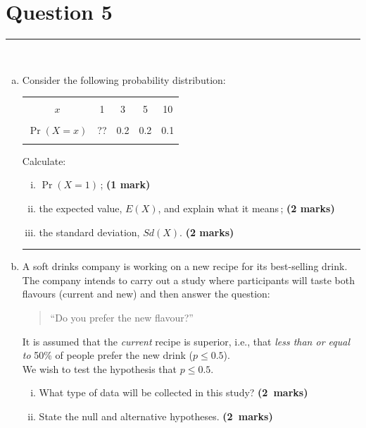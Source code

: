\documentclass[12pt]{article}
\begin{document}
\section*{Question 5 }
\noindent\rule{\linewidth}{1pt}
\quad\\[-0.5cm]
\begin{enumerate}[a)]
\item Consider the following probability distribution:
\begin{center}
\begin{tabular}{|c|cccc|}
\hline
&&&&\\[-0.4cm]
$x$        & 1 & 3 & 5 & 10 \\
\hline
&&&&\\[-0.4cm]
$\Pr(X=x)$ & ?? & 0.2 & 0.2 & 0.1 \\
\hline
\multicolumn{5}{c}{}
\end{tabular}
\end{center}
Calculate:
    \begin{enumerate}[i)]\itemsep0.2cm
    \item $\Pr(X=1)$\,; \hfill{\scriptsize \bf (1 mark)}
    \item the expected value, $E(X)$, and explain what it means\,; \hfill{\scriptsize \bf (2 marks)}
    \item the standard deviation, $Sd(X)$. \hfill{\scriptsize \bf (2 marks)}
    \end{enumerate}
\begin{center}\noindent\rule{0.4\linewidth}{0.5pt}\end{center}
\item A soft drinks company is working on a new recipe for its best-selling drink. The company intends to carry out a study where participants will taste both flavours (current and new) and then answer the question:
    \begin{quotation}
    ``Do you prefer the new flavour?''
    \end{quotation}
    It is assumed that the \emph{current} recipe is superior, i.e., that \emph{less than or equal to} 50\% of people prefer the new drink ($p \le 0.5$).\\[0.4cm]
    We wish to test the hypothesis that $p \le 0.5$.\\[-0.4cm]
    \begin{enumerate}[i)]\itemsep0.3cm
    \item What type of data will be collected in this study? \hfill{\mbox{\scriptsize \bf (2 marks)}}
    \item State the null and alternative hypotheses. \hfill{\mbox{\scriptsize \bf (2 marks)}}

\end{enumerate}
\end{enumerate}
\end{document}
